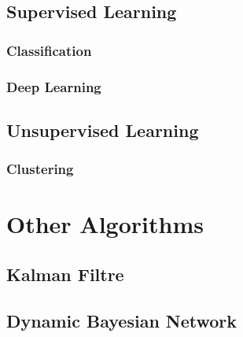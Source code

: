 \subsection{Supervised Learning}

\subsubsection{Classification}

\subsubsection{Deep Learning}


\subsection{Unsupervised Learning}

\subsubsection{Clustering}

\section{Other Algorithms}

\subsection{Kalman Filtre}

\subsection{Dynamic Bayesian Network}




